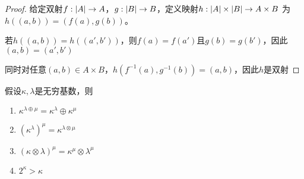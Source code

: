 \documentclass[11pt]{article}
\begin{document}
\begin{proof}
给定双射\(f:\abs{A}\to A\)，\(g:\abs{B}\to B\)，定义映射\(h:\abs{A}\times\abs{B}\to A\times B\)
为\(h((a,b))=(f(a),g(b))\)。

若\(h((a,b))=h((a',b'))\)，则\(f(a)=f(a')\)且\(g(b)=g(b')\)，因此\((a,b)=(a',b')\)

同时对任意\((a,b)\in A\times B\)，\(h(f^{-1}(a),g^{-1}(b))=(a,b)\)，因此\(h\)是双射
\end{proof}

\begin{exercise}[2.2.12]
假设\(\kappa,\lambda\)是无穷基数，则
\begin{enumerate}
\item \(\kappa^{\lambda\oplus\mu}=\kappa^\lambda\oplus\kappa^\mu\)
\item \((\kappa^\lambda)^\mu=\kappa^{\lambda\otimes \mu}\)
\item \((\kappa\otimes\lambda)^\mu=\kappa^\mu\otimes\lambda^\mu\)
\item \(2^\kappa>\kappa\)
\end{enumerate}
\end{exercise}
\end{document}
